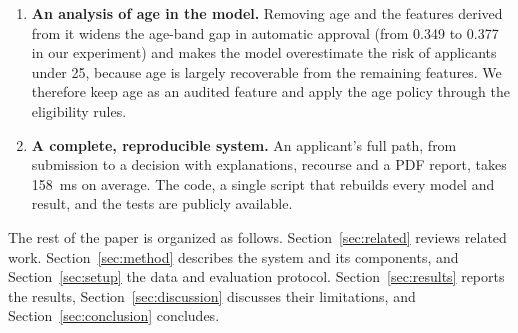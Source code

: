 \begin{enumerate}
against 17.7\% for random search, 14.3\% for the standard search and 8.7\% for a baseline engine without these safeguards.
\item \textbf{An analysis of age in the model.} Removing age and the features derived from it widens the age-band
gap in automatic approval (from 0.349 to 0.377 in our experiment) and makes the model overestimate the risk of applicants under 25,
because age is largely recoverable from the remaining features. We therefore keep age as an audited feature and apply
the age policy through the eligibility rules.
\item \textbf{A complete, reproducible system.} An applicant's full path, from submission to a decision with
explanations, recourse and a PDF report, takes 158~ms on average. The code, a single script that rebuilds every model
and result, and the tests are publicly available.
\end{enumerate}

The rest of the paper is organized as follows. Section~\ref{sec:related} reviews related work.
Section~\ref{sec:method} describes the system and its components, and Section~\ref{sec:setup} the data and
evaluation protocol. Section~\ref{sec:results} reports the results, Section~\ref{sec:discussion} discusses their
limitations, and Section~\ref{sec:conclusion} concludes.
